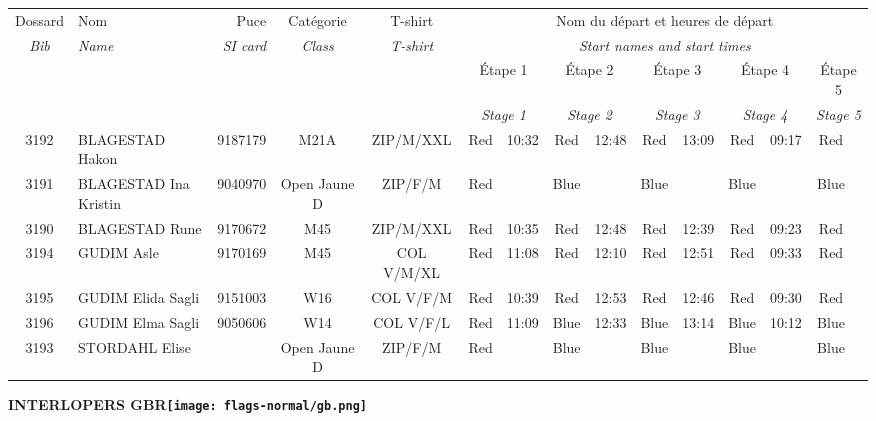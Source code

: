 \documentclass{report}
\begin{document}
  \begin{longtable}{|c|l|r|c|c|*{5}{cc|}}
    Dossard & Nom  & Puce    & Catégorie & T-shirt & \multicolumn{10}{c|}{Nom du départ et heures de départ} \\
    \itshape Bib     & \itshape Name & \itshape SI card & \itshape Class  & \itshape  T-shirt  & \multicolumn{10}{c|}{\itshape Start names and start times} \\
    \hline
    & & & & & \multicolumn{2}{c|}{Étape 1} & \multicolumn{2}{c|}{Étape 2} & \multicolumn{2}{c|}{Étape 3} & \multicolumn{2}{c|}{Étape 4} & \multicolumn{2}{c|}{Étape 5} \\
    & & & & & \multicolumn{2}{c|}{\itshape Stage 1} & \multicolumn{2}{c|}{\itshape Stage 2} & \multicolumn{2}{c|}{\itshape Stage 3} & \multicolumn{2}{c|}{\itshape Stage 4} & \multicolumn{2}{c|}{\itshape Stage 5} \\
    \hline
    3192 & BLAGESTAD Hakon & 9187179 & M21A & ZIP/M/XXL & Red & 10:32 & Red & 12:48 & Red & 13:09 & Red & 09:17 & Red &  \\
    3191 & BLAGESTAD Ina Kristin & 9040970 & Open Jaune D & ZIP/F/M & Red &   & Blue &   & Blue &   & Blue &   & Blue &  \\
    3190 & BLAGESTAD Rune & 9170672 & M45 & ZIP/M/XXL & Red & 10:35 & Red & 12:48 & Red & 12:39 & Red & 09:23 & Red &  \\
    3194 & GUDIM Asle & 9170169 & M45 & COL V/M/XL & Red & 11:08 & Red & 12:10 & Red & 12:51 & Red & 09:33 & Red &  \\
    3195 & GUDIM Elida Sagli & 9151003 & W16 & COL V/F/M & Red & 10:39 & Red & 12:53 & Red & 12:46 & Red & 09:30 & Red &  \\
    3196 & GUDIM Elma Sagli & 9050606 & W14 & COL V/F/L & Red & 11:09 & Blue & 12:33 & Blue & 13:14 & Blue & 10:12 & Blue &  \\
    3193 & STORDAHL Elise &  & Open Jaune D & ZIP/F/M & Red &   & Blue &   & Blue &   & Blue &   & Blue &  \\
  \end{longtable}
\newpage
  \Huge \centering \bfseries INTERLOPERS  GBR\normalfont \footnotesize \sffamily \hfill \texttt{[image: flags-normal/gb.png]} \newline 
\end{document}
